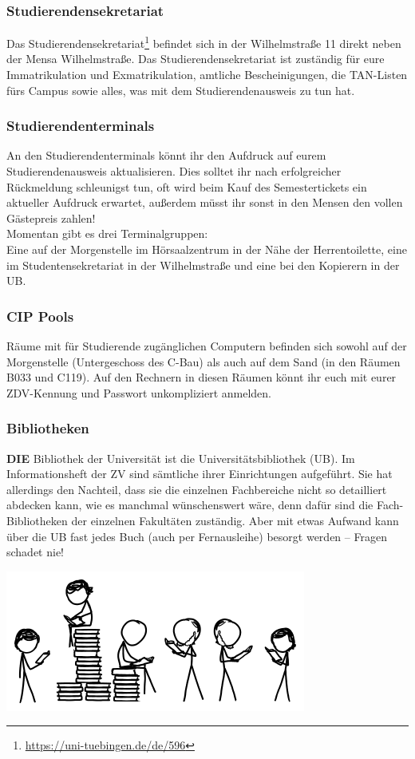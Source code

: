 \subsubsection*{Studierendensekretariat}
Das Studierendensekretariat\footnote{\url{https://uni-tuebingen.de/de/596}} befindet sich in der Wilhelmstraße 11 direkt neben der Mensa Wilhelmstraße. Das Studierendensekretariat ist zuständig für eure Immatrikulation und Exmatrikulation, amtliche Bescheinigungen, die TAN-Listen fürs Campus sowie alles, was mit dem Studierendenausweis zu tun hat.

\subsubsection*{Studierendenterminals}
An den Studierendenterminals könnt ihr den Aufdruck auf eurem
Studierendenausweis aktualisieren. Dies solltet ihr nach erfolgreicher Rückmeldung schleunigst tun, oft wird beim Kauf des Semestertickets ein aktueller Aufdruck erwartet, außerdem müsst ihr sonst in den Mensen
den vollen Gästepreis zahlen!\\
Momentan gibt es drei Terminalgruppen:\\
Eine auf der Morgenstelle im Hörsaalzentrum in der Nähe der Herrentoilette,
eine im Studentensekretariat in der Wilhelmstraße und eine bei den Kopierern in der UB.

\subsubsection*{CIP Pools}
Räume mit für Studierende zugänglichen Computern befinden sich sowohl auf der Morgenstelle (Untergeschoss des C-Bau) als auch auf dem Sand (in den Räumen B033 und C119). Auf den Rechnern in diesen Räumen könnt ihr euch mit eurer ZDV-Kennung und Passwort unkompliziert anmelden.

\subsubsection*{Bibliotheken}
\textbf{DIE} Bibliothek der Universität ist die
Universitätsbibliothek (UB).  Im Informationsheft der ZV sind
sämtliche ihrer Einrichtungen auf\-ge\-führt.  Sie hat
allerdings den Nachteil, dass sie die einzelnen Fachbereiche nicht so
detailliert abdecken kann, wie es manchmal wünschenswert wäre,
denn dafür sind die Fach-Bibliotheken der einzelnen Fakultäten
zuständig.  Aber mit etwas Aufwand kann über die UB fast jedes Buch
(auch per Fernausleihe) besorgt werden -- Fragen schadet nie!
\begin{center}
\includegraphics[width=0.45\hsize]{info/xkcd/books_toomany.png}
\end{center}

